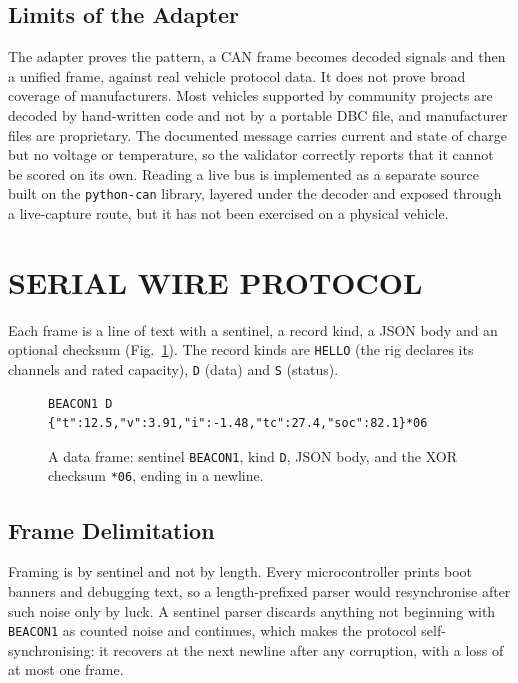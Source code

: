 \subsection{Limits of the Adapter}

The adapter proves the pattern, a CAN frame becomes decoded signals and then a unified frame, against real vehicle protocol data. It does not prove broad coverage of manufacturers. Most vehicles supported by community projects are decoded by hand-written code and not by a portable DBC file, and manufacturer files are proprietary. The documented message carries current and state of charge but no voltage or temperature, so the validator correctly reports that it cannot be scored on its own. Reading a live bus is implemented as a separate source built on the \texttt{python-can} library, layered under the decoder and exposed through a live-capture route, but it has not been exercised on a physical vehicle.

\section{SERIAL WIRE PROTOCOL}
\label{sec:impl-protocol}

Each frame is a line of text with a sentinel, a record kind, a JSON body and an optional checksum (Fig.~\ref{fig:frame}). The record kinds are \texttt{HELLO} (the rig declares its channels and rated capacity), \texttt{D} (data) and \texttt{S} (status).

\begin{figure}[htbp]
    \centering
    {\footnotesize
\begin{verbatim}
BEACON1 D {"t":12.5,"v":3.91,"i":-1.48,"tc":27.4,"soc":82.1}*06
\end{verbatim}}
    \caption{A data frame: sentinel \texttt{BEACON1}, kind \texttt{D}, JSON body, and the XOR checksum \texttt{*06}, ending in a newline.}
    \label{fig:frame}
\end{figure}

\subsection{Frame Delimitation}

Framing is by sentinel and not by length. Every microcontroller prints boot banners and debugging text, so a length-prefixed parser would resynchronise after such noise only by luck. A sentinel parser discards anything not beginning with \texttt{BEACON1} as counted noise and continues, which makes the protocol self-synchronising: it recovers at the next newline after any corruption, with a loss of at most one frame.

